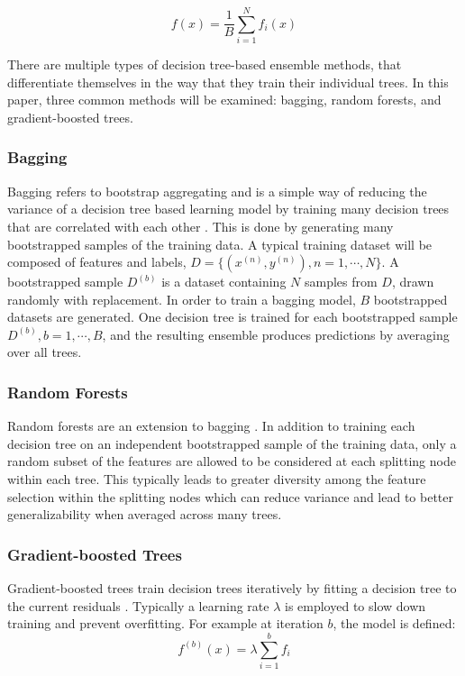 \documentclass[pageno]{jpaper}
\begin{document}
\begin{doublespacing}
$$f(x) = \frac{1}{B} \sum_{i=1}^N f_i(x)$$

There are multiple types of decision tree-based ensemble methods, that differentiate themselves in the way that they train their individual trees. In this paper, three common methods will be examined: bagging, random forests, and gradient-boosted trees.

\subsubsection{Bagging}
Bagging refers to bootstrap aggregating and is a simple way of reducing the variance of a decision tree based learning model by training many decision trees that are correlated with each other \cite{breiman1996}. This is done by generating many bootstrapped samples of the training data. A typical training dataset will be composed of features and labels, $D = \{ (x^{(n)}, y^{(n)}), n = 1, \cdots, N \}$. A bootstrapped sample $D^{(b)}$ is a dataset containing $N$ samples from $D$, drawn randomly with replacement. In order to train a bagging model, $B$ bootstrapped datasets are generated. One decision tree is trained for each bootstrapped sample $D^{(b)}, b=1, \cdots, B$, and the resulting ensemble produces predictions by averaging over all trees.

\subsubsection{Random Forests}
Random forests are an extension to bagging \cite{breiman2001}. In addition to training each decision tree on an independent bootstrapped sample of the training data, only a random subset of the features are allowed to be considered at each splitting node within each tree. This typically leads to greater diversity among the feature selection within the splitting nodes which can reduce variance and lead to better generalizability when averaged across many trees.

\subsubsection{Gradient-boosted Trees}
Gradient-boosted trees train decision trees iteratively by fitting a decision tree to the current residuals \cite{friedman}. Typically a learning rate $\lambda$  is employed to slow down training and prevent overfitting. For example at iteration $b$, the model is defined:
$$f^{(b)}(x) = \lambda \sum_{i = 1}^b f_i$$


\end{doublespacing}
\end{document}
